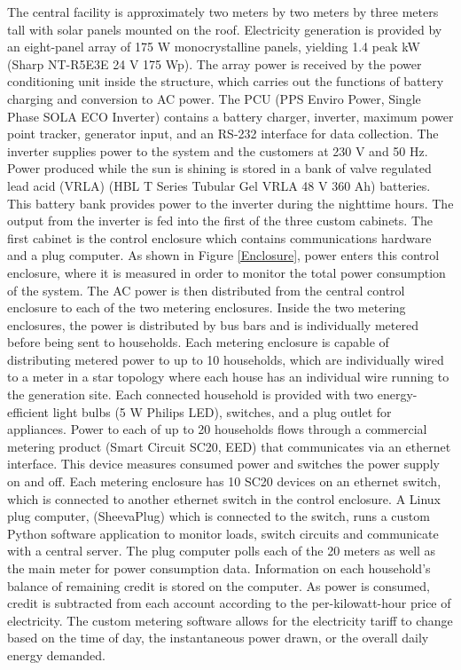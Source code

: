 \documentclass{sig-alternate}
\begin{document}
The central facility is approximately two meters by 
two meters by three meters tall
with solar panels mounted on the roof.
Electricity generation is provided by an eight-panel array of 175 W
monocrystalline panels, yielding 1.4 peak kW (Sharp NT-R5E3E 24 V 175 Wp).
The array power is received by the power conditioning unit inside the
structure, which carries out the functions of battery charging and
conversion to AC power.
The PCU (PPS Enviro Power, Single Phase SOLA ECO Inverter) contains a
battery charger, inverter, maximum power point tracker, generator input,
and an RS-232 interface for data collection.
The inverter supplies power to the system and the customers at 230 V and
50 Hz.
Power produced while the sun is shining is stored in a bank of valve
regulated lead acid (VRLA) (HBL T Series Tubular Gel VRLA 48 V 360 Ah)
batteries.
This battery bank provides power to the inverter during the nighttime hours.
The output from the inverter is fed into the first of the three custom
cabinets.
The first cabinet is the control enclosure which contains communications hardware and a plug computer.
As shown in Figure \ref{Enclosure}, power enters this control enclosure,
where it is measured in order to monitor the total power consumption of the
system.
The AC power is then distributed from the central control enclosure to
each of the two metering enclosures.
Inside the two metering enclosures, the power is distributed by bus bars
and is individually metered before being sent to households.
Each metering enclosure is capable of distributing metered power to up
to 10 households, which are individually wired to a meter in a star
topology where each house has an individual wire running to the generation
site.
Each connected household is provided with two energy-efficient light
bulbs (5 W Philips LED), switches, and a plug outlet for appliances.
Power to each of up to 20 households flows through a commercial metering
product (Smart Circuit SC20, EED) that communicates via an ethernet
interface.
This device measures consumed power and switches the power supply on and off.
Each metering enclosure has 10 SC20 devices on an ethernet switch, which is connected to another
ethernet switch in the control enclosure.
A Linux plug computer, \mbox{(SheevaPlug)} which is connected to the switch,
runs a custom Python software application to monitor loads, switch
circuits and communicate with a central server.
The plug computer polls each of the 20 meters as well as the main meter for
power consumption data.
Information on each household's balance of remaining credit is stored on
the computer.
As power is consumed, credit is subtracted from each account according to the
per-kilowatt-hour price of electricity.
The custom metering software allows for the electricity tariff to change
based on the time of day, the instantaneous power drawn, or the overall
daily energy demanded.
\end{document}
